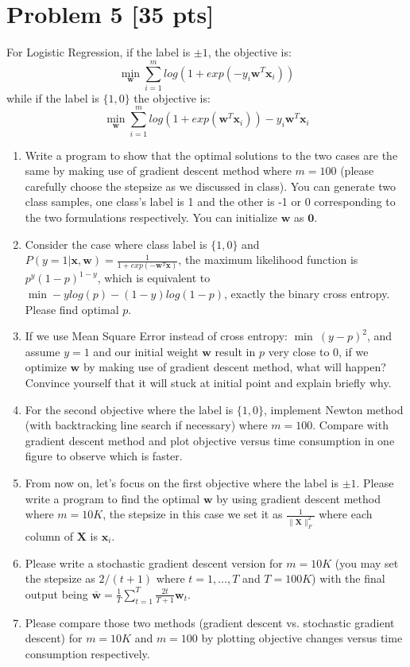 \documentclass[11pt]{article}
\newcommand{\mtx}[1]{\mathbf{#1}}
\newcommand{\vct}[1]{\mathbf{#1}}
\def \mX {\mtx{X}}
\def \vzero    {\vct{0}}
\def \vw {\vct{w}}
\def \vx {\vct{x}}
\begin{document}
\section*{Problem 5 [35 pts]}
For Logistic Regression, if the label is $\pm1$, the objective is:
\begin{equation}
\min_\vw	\sum_{i=1}^{m}log(1+exp(-y_i\vw^T\vx_i))
\end{equation}
while if the label is $\{1,0\}$ the objective is:
\begin{equation}
	\min_\vw	\sum_{i=1}^{m}log(1+exp(\vw^T\vx_i))-y_i\vw^T\vx_i
\end{equation}
\begin{enumerate}
	\item Write a program to show that the optimal solutions to the two cases  are the same by making use of gradient descent method where $m=100$ (please carefully choose the stepsize as we discussed in class). You can generate two class samples, one class's label is 1 and the other is -1 or 0 corresponding to the two formulations respectively. You can initialize $\vw$ as $\vzero$.
	\item Consider the case where class label is $\{1,0\}$ and $P(y=1|\vx,\vw)=\frac{1}{1+exp(-\vw^T\vx)}$, the maximum likelihood function is $p^y(1-p)^{1-y}$, which is equivalent to $\min -ylog(p)-(1-y)log(1-p)$, exactly the binary cross entropy. Please find optimal $p$.
	\item If we use Mean Square Error instead of cross entropy: $\min \ (y-p)^2$, and assume $y=1$ and our initial weight $\vw$ result in $p$ very close to 0, if we optimize $\vw$ by making use of gradient descent method, what will happen? Convince yourself that it will stuck at initial point and explain briefly why.
	\item For the second objective where the label is $\{1,0\}$, implement Newton method (with backtracking line search if necessary) where $m=100$.  Compare with gradient descent method and plot objective versus time consumption in one figure to observe which is faster.
	\item From now on, let's focus on the first objective where the label is $\pm1$. Please write a program to find the optimal  $\vw$ by using gradient descent method where $m=10K$, the stepsize in this case we set it as $\frac{1}{\|\mX\|_F^2}$ where each column of $\mX$ is $\vx_i$.
	\item Please write a stochastic gradient descent version for $m=10K$ (you may set the stepsize as $2/(t+1)$ where $t=1,\dots,T$ and $T=100K$) with the final output being $\bar{\vw}=\frac{1}{T}\sum_{t=1}^{T}\frac{2t}{T+1}\vw_t$.  
	\item Please compare those two methods (gradient descent vs. stochastic gradient descent) for $m=10K$ and $m=100$ by plotting objective changes versus time consumption respectively.
\end{enumerate}
\end{document}
